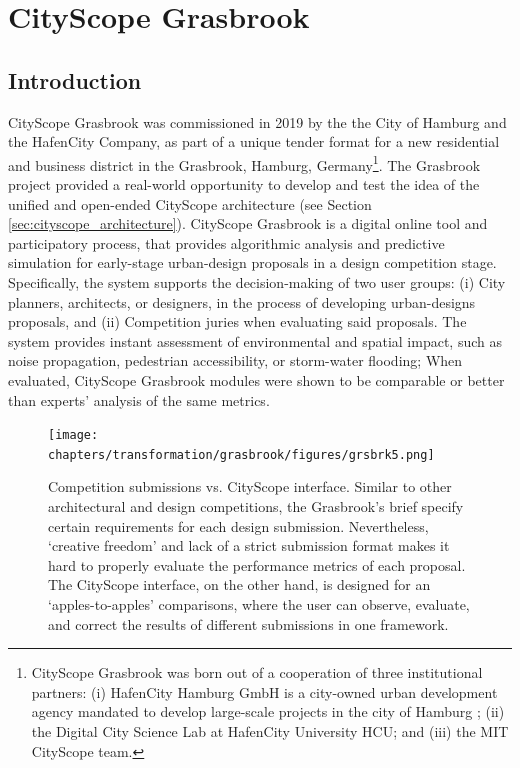 \section{CityScope Grasbrook}\label{sec:grasbrook}

{
    \subsection{Introduction}
    {
        CityScope Grasbrook was commissioned in 2019 by the the City of Hamburg and the HafenCity Company, as part of a unique tender format for a new residential and business district in the Grasbrook, Hamburg, Germany\footnote{CityScope Grasbrook was born out of a cooperation of three institutional partners: (i) HafenCity Hamburg GmbH is a city-owned urban development agency mandated to develop large-scale projects in the city of Hamburg \cite{cgha19, br18}; (ii) the Digital City Science Lab at HafenCity University HCU; and (iii) the MIT CityScope team.}. The Grasbrook project provided a real-world opportunity to develop and test the idea of the unified and open-ended CityScope architecture (see Section \eqref{sec:cityscope_architecture}). CityScope Grasbrook is a digital online tool and participatory process, that provides algorithmic analysis and predictive simulation for early-stage urban-design proposals in a design competition stage. Specifically, the system supports the decision-making of two user groups: (i) City planners, architects, or designers, in the process of developing urban-designs proposals, and (ii) Competition juries when evaluating said proposals. The system provides instant assessment of environmental and spatial impact, such as noise propagation, pedestrian accessibility, or storm-water flooding; When evaluated, CityScope Grasbrook modules were shown to be comparable or better than experts' analysis of the same metrics.



        \begin{figure}[!htb]
            \begin{center}
                \texttt{[image: chapters/transformation/grasbrook/figures/grsbrk5.png]}
            \end{center}
            \caption{Competition submissions vs. CityScope interface. Similar to other architectural and design competitions, the Grasbrook's brief specify certain requirements for each design submission. Nevertheless, `creative freedom' and lack of a strict submission format makes it hard to properly evaluate the performance metrics of each proposal. The CityScope interface, on the other hand, is designed for an `apples-to-apples' comparisons, where the user can observe, evaluate, and correct the results of different submissions in one framework.}
            \label{fig:grasbrook_competition_vs_cs}
        \end{figure}

}}
